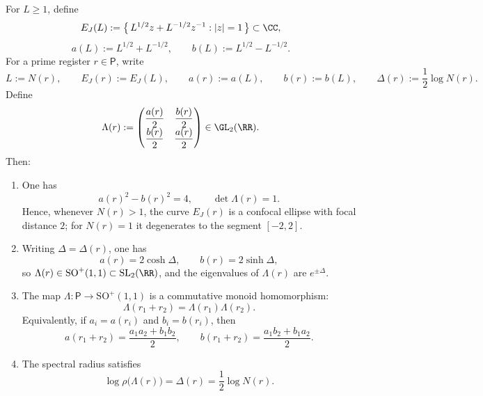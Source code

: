 \begin{theorem}\label{thm:godel-lorentz-algebraization}
For \(L\ge 1\), define
\[
E_J(L):=\bigl\{\,L^{1/2}z+L^{-1/2}z^{-1}:|z|=1\,\bigr\}\subset\CC,
\]
\[
a(L):=L^{1/2}+L^{-1/2},
\qquad
b(L):=L^{1/2}-L^{-1/2}.
\]
For a prime register \(r\in\mathsf P\), write
\[
L:=N(r),
\qquad
E_J(r):=E_J(L),
\qquad
a(r):=a(L),
\qquad
b(r):=b(L),
\qquad
\Delta(r):=\frac12\log N(r).
\]
Define
\[
\Lambda(r):=
\begin{pmatrix}
\dfrac{a(r)}{2} & \dfrac{b(r)}{2}\\[2pt]
\dfrac{b(r)}{2} & \dfrac{a(r)}{2}
\end{pmatrix}\in\GL_2(\RR).
\]
Then:
\begin{enumerate}
  \item One has
  \[
  a(r)^2-b(r)^2=4,
  \qquad
  \det\Lambda(r)=1.
  \]
  Hence, whenever \(N(r)>1\), the curve \(E_J(r)\) is a confocal ellipse with focal distance \(2\); for \(N(r)=1\) it degenerates to the segment \([-2,2]\).

  \item Writing \(\Delta=\Delta(r)\), one has
  \[
  a(r)=2\cosh\Delta,
  \qquad
  b(r)=2\sinh\Delta,
  \]
  so \(\Lambda(r)\in \mathrm{SO}^+(1,1)\subset \mathrm{SL}_2(\RR)\), and the eigenvalues of \(\Lambda(r)\) are \(e^{\pm\Delta}\).

  \item The map \(\Lambda:\mathsf P\to \mathrm{SO}^+(1,1)\) is a commutative monoid homomorphism:
  \[
  \Lambda(r_1+r_2)=\Lambda(r_1)\Lambda(r_2).
  \]
  Equivalently, if \(a_i=a(r_i)\) and \(b_i=b(r_i)\), then
  \[
  a(r_1+r_2)=\frac{a_1a_2+b_1b_2}{2},
  \qquad
  b(r_1+r_2)=\frac{a_1b_2+b_1a_2}{2}.
  \]

  \item The spectral radius satisfies
  \[
  \log\rho\bigl(\Lambda(r)\bigr)=\Delta(r)=\frac12\log N(r).
  \]
\end{enumerate}
\end{theorem}

